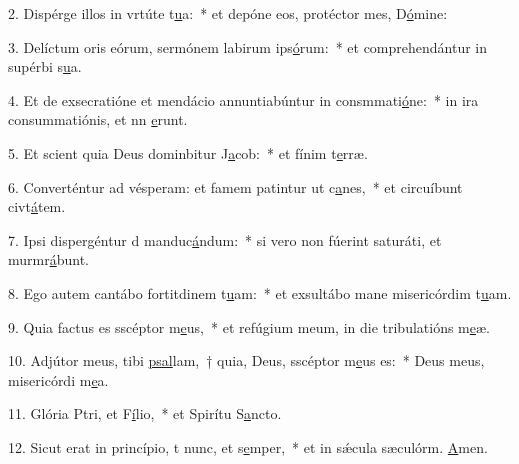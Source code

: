 2. Dispérge illos in vrtúte t\uline{u}a:~* et depóne eos, protéctor mes, D\uline{ó}mine:\par 
3. Delíctum oris eórum, sermónem labirum ips\uline{ó}rum:~* et comprehendántur in supérbi s\uline{u}a.\par 
4. Et de exsecratióne et mendácio annuntiabúntur in consmmati\uline{ó}ne:~* in ira consummatiónis, et nn \uline{e}runt.\par 
5. Et scient quia Deus dominbitur J\uline{a}cob:~* et fínim t\uline{e}rræ.\par 
6. Converténtur ad vésperam: et famem patintur ut c\uline{a}nes,~* et circuíbunt civt\uline{á}tem.\par 
7. Ipsi dispergéntur d manduc\uline{á}ndum:~* si vero non fúerint saturáti, et murmr\uline{á}bunt.\par 
8. Ego autem cantábo fortitdinem t\uline{u}am:~* et exsultábo mane misericórdim t\uline{u}am.\par 
9. Quia factus es sscéptor m\uline{e}us,~* et refúgium meum, in die tribulatións m\uline{e}æ.\par 
10. Adjútor meus, tibi \uline{psal}lam,~† quia, Deus, sscéptor m\uline{e}us es:~* Deus meus, misericórdi m\uline{e}a.\par 
11. Glória Ptri, et F\uline{í}lio,~* et Spirítu S\uline{a}ncto.\par 
12. Sicut erat in princípio, t nunc, et s\uline{e}mper,~* et in sǽcula sæculórm. \uline{A}men.\par 
